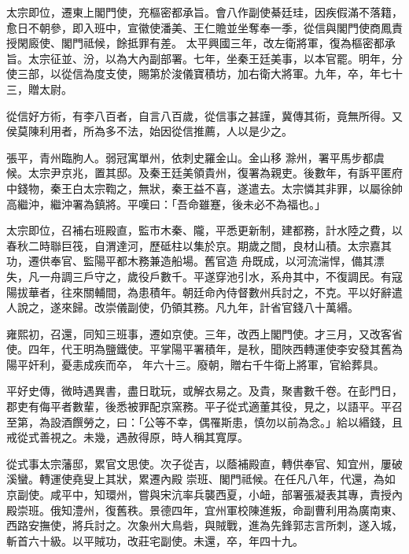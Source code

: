 \begin{pinyinscope}
 太宗即位，遷東上閣門使，充樞密都承旨。會八作副使綦廷珪，因疾假滿不落籍，愈日不朝參，即入班中，宣徽使潘美、王仁贍並坐奪奉一季，從信與閣門使商鳳責授閑廄使、閣門祗候，餘抵罪有差。
 太平興國三年，改左衛將軍，復為樞密都承旨。太宗征並、汾，以為大內副部署。七年，坐秦王廷美事，以本官罷。明年，分使三部，以從信為度支使，賜第於浚儀寶積坊，加右衛大將軍。九年，卒，年七十三，贈太尉。



 從信好方術，有李八百者，自言八百歲，從信事之甚謹，冀傳其術，竟無所得。又侯莫陳利用者，所為多不法，始因從信推薦，人以是少之。



 張平，青州臨朐人。弱冠寓單州，依刺史羅金山。金山移
 滁州，署平馬步都虞候。太宗尹京兆，置其邸。及秦王廷美領貴州，復署為親吏。後數年，有訴平匿府中錢物，秦王白太宗鞫之，無狀，秦王益不喜，遂遣去。太宗憐其非罪，以屬徐帥高繼沖，繼沖署為鎮將。平嘆曰：「吾命雖蹇，後未必不為福也。」



 太宗即位，召補右班殿直，監市木秦、隴，平悉更新制，建都務，計水陸之費，以春秋二時聯巨筏，自渭達河，歷砥柱以集於京。期歲之間，良材山積。太宗嘉其功，遷供奉官、監陽平都木務兼造船場。舊官造
 舟既成，以河流湍悍，備其漂失，凡一舟調三戶守之，歲役戶數千。平遂穿池引水，系舟其中，不復調民。有寇陽拔華者，往來關輔間，為患積年。朝廷命內侍督數州兵討之，不克。平以好辭遣人說之，遂來歸。改崇儀副使，仍領其務。凡九年，計省官錢八十萬緡。



 雍熙初，召還，同知三班事，遷如京使。三年，改西上閣門使。才三月，又改客省使。四年，代王明為鹽鐵使。平掌陽平署積年，是秋，聞陜西轉運使李安發其舊為陽平奸利，憂恚成疾而卒，
 年六十三。廢朝，贈右千牛衛上將軍，官給葬具。



 平好史傳，微時遇異書，盡日耽玩，或解衣易之。及貴，聚書數千卷。在彭門日，郡吏有侮平者數輩，後悉被罪配京窯務。平子從式適董其役，見之，以語平。平召至第，為設酒饌勞之，曰：「公等不幸，偶罹斯患，慎勿以前為念。」給以緡錢，且戒從式善視之。未幾，遇赦得原，時人稱其寬厚。



 從式事太宗藩邸，累官文思使。次子從吉，以蔭補殿直，轉供奉官、知宜州，屢破溪蠻。轉運使堯叟上其狀，累遷內殿
 崇班、閣門祗候。在任凡八年，代還，為如京副使。咸平中，知環州，嘗與宋沆率兵襲西夏，小衄，部署張凝表其專，責授內殿崇班。俄知澧州，復舊秩。景德四年，宜州軍校陳進叛，命副曹利用為廣南東、西路安撫使，將兵討之。次象州大鳥砦，與賊戰，進為先鋒郭志言所刺，遂入城，斬首六十級。以平賊功，改莊宅副使。未還，卒，年四十九。




\end{pinyinscope}
